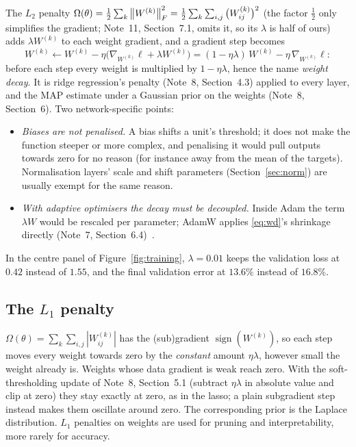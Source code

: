 \documentclass[11pt]{article}
\begin{document}
The $L_2$ penalty $\Omega(\theta) = \frac12\sum_k\left\lVert W^{(k)} \right\rVert_F^2 = \frac12\sum_k\sum_{i,j}\big(W^{(k)}_{ij}\big)^2$
(the factor $\frac12$ only simplifies the gradient; Note~11, Section~7.1, omits it, so its $\lambda$ is half of
ours) adds
$\lambda W^{(k)}$ to each weight gradient, and a gradient step becomes
\begin{equation}\label{eq:wd}
  W^{(k)} \gets W^{(k)} - \eta\big(\nabla_{W^{(k)}}\ell + \lambda W^{(k)}\big) = (1 - \eta\lambda)\,W^{(k)} - \eta\,\nabla_{W^{(k)}}\ell :
\end{equation}
before each step every weight is multiplied by $1 - \eta\lambda$, hence the name \emph{weight decay}. It is ridge
regression's penalty (Note~8, Section~4.3) applied to every layer, and the MAP estimate under a Gaussian prior on the
weights (Note~8, Section~6). Two network-specific points:
\begin{itemize}
\item \emph{Biases are not penalised.} A bias shifts a unit's threshold; it does not make the function steeper or more
  complex, and penalising it would pull outputs towards zero for no reason (for instance away from the mean of the
  targets). Normalisation layers' scale and shift parameters (Section~\ref{sec:norm}) are usually exempt for the same
  reason.
\item \emph{With adaptive optimisers the decay must be decoupled.} Inside Adam the term $\lambda W$ would be rescaled
  per parameter; AdamW applies \eqref{eq:wd}'s shrinkage directly (Note~7, Section~6.4)~\cite{loshchilov2019}.
\end{itemize}
In the centre panel of Figure~\ref{fig:training}, $\lambda = 0.01$ keeps the validation loss at $0.42$ instead of
$1.55$, and the final validation error at $13.6\%$ instead of $16.8\%$.

\subsection{The \texorpdfstring{$L_1$}{L1} penalty}\label{sec:l1}

$\Omega(\theta) = \sum_k\sum_{i,j}|W^{(k)}_{ij}|$ has the (sub)gradient $\operatorname{sign}(W^{(k)})$, so each step moves
every weight towards zero by the \emph{constant} amount $\eta\lambda$, however small the weight already is. Weights whose
data gradient is weak reach zero. With the soft-thresholding update of Note~8, Section~5.1 (subtract $\eta\lambda$ in
absolute value and clip at zero) they stay exactly at zero, as in the lasso; a plain subgradient step instead makes them
oscillate around zero. The corresponding prior is the Laplace distribution. $L_1$ penalties on weights are used for pruning and interpretability, more rarely for accuracy.
\end{document}
